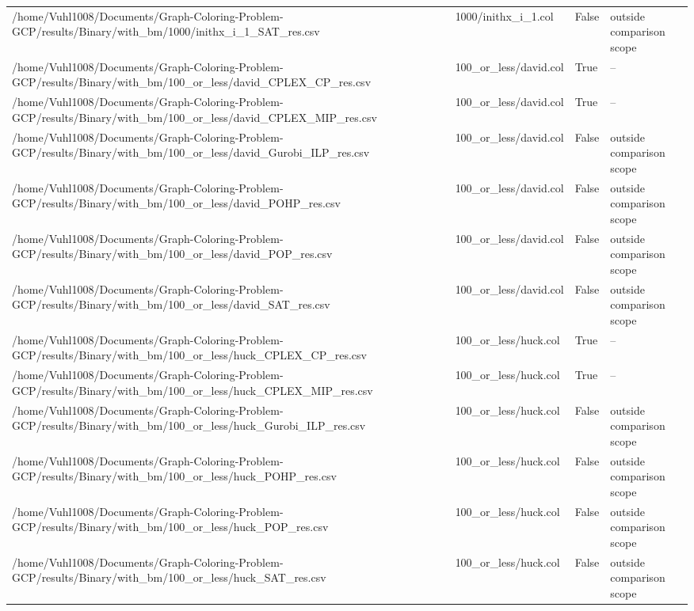 \begin{table}[htbp]
\begin{tabular}{llll}
/home/Vuhl1008/Documents/Graph-Coloring-Problem-GCP/results/Binary/with\_bm/1000/inithx\_i\_1\_SAT\_res.csv & 1000/inithx\_i\_1.col & False & outside comparison scope \\
/home/Vuhl1008/Documents/Graph-Coloring-Problem-GCP/results/Binary/with\_bm/100\_or\_less/david\_CPLEX\_CP\_res.csv & 100\_or\_less/david.col & True & -- \\
/home/Vuhl1008/Documents/Graph-Coloring-Problem-GCP/results/Binary/with\_bm/100\_or\_less/david\_CPLEX\_MIP\_res.csv & 100\_or\_less/david.col & True & -- \\
/home/Vuhl1008/Documents/Graph-Coloring-Problem-GCP/results/Binary/with\_bm/100\_or\_less/david\_Gurobi\_ILP\_res.csv & 100\_or\_less/david.col & False & outside comparison scope \\
/home/Vuhl1008/Documents/Graph-Coloring-Problem-GCP/results/Binary/with\_bm/100\_or\_less/david\_POHP\_res.csv & 100\_or\_less/david.col & False & outside comparison scope \\
/home/Vuhl1008/Documents/Graph-Coloring-Problem-GCP/results/Binary/with\_bm/100\_or\_less/david\_POP\_res.csv & 100\_or\_less/david.col & False & outside comparison scope \\
/home/Vuhl1008/Documents/Graph-Coloring-Problem-GCP/results/Binary/with\_bm/100\_or\_less/david\_SAT\_res.csv & 100\_or\_less/david.col & False & outside comparison scope \\
/home/Vuhl1008/Documents/Graph-Coloring-Problem-GCP/results/Binary/with\_bm/100\_or\_less/huck\_CPLEX\_CP\_res.csv & 100\_or\_less/huck.col & True & -- \\
/home/Vuhl1008/Documents/Graph-Coloring-Problem-GCP/results/Binary/with\_bm/100\_or\_less/huck\_CPLEX\_MIP\_res.csv & 100\_or\_less/huck.col & True & -- \\
/home/Vuhl1008/Documents/Graph-Coloring-Problem-GCP/results/Binary/with\_bm/100\_or\_less/huck\_Gurobi\_ILP\_res.csv & 100\_or\_less/huck.col & False & outside comparison scope \\
/home/Vuhl1008/Documents/Graph-Coloring-Problem-GCP/results/Binary/with\_bm/100\_or\_less/huck\_POHP\_res.csv & 100\_or\_less/huck.col & False & outside comparison scope \\
/home/Vuhl1008/Documents/Graph-Coloring-Problem-GCP/results/Binary/with\_bm/100\_or\_less/huck\_POP\_res.csv & 100\_or\_less/huck.col & False & outside comparison scope \\
/home/Vuhl1008/Documents/Graph-Coloring-Problem-GCP/results/Binary/with\_bm/100\_or\_less/huck\_SAT\_res.csv & 100\_or\_less/huck.col & False & outside comparison scope \\

\end{tabular}
\end{table}
